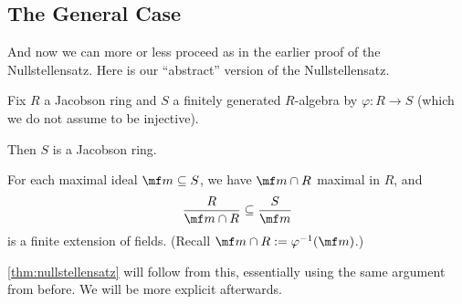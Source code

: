 \subsection{The General Case}
And now we can more or less proceed as in the earlier proof of the Nullstellensatz. Here is our ``abstract'' version of the Nullstellensatz.
\begin{theorem} \label{thm:gennullstellensatz}
	Fix $R$ a Jacobson ring and $S$ a finitely generated $R$-algebra by $\varphi:R\to S$ (which we do not assume to be injective).
	\begin{listalph}
		\item Then $S$ is a Jacobson ring.
		\item For each maximal ideal $\mf m\subseteq S$, we have $\mf m\cap R$ maximal in $R$, and
		\[\frac R{\mf m\cap R}\subseteq\frac S{\mf m}\]
		is a finite extension of fields. (Recall $\mf m\cap R:=\varphi^{-1}(\mf m)$.)
	\end{listalph}
\end{theorem}
\autoref{thm:nullstellensatz} will follow from this, essentially using the same argument from before. We will be more explicit afterwards.
